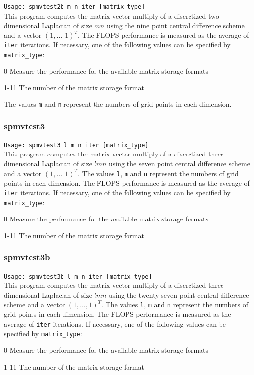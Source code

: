 \documentclass[a4paper]{article}
\newcommand{\namelistlabel}[1]{\mbox{#1}\hfill}
\newenvironment{namelist}[1]{%
\begin{list}{}
  {\let\makelabel\namelistlabel
  \settowidth{\labelwidth}{#1}
  \setlength{\leftmargin}{1.1\labelwidth}}
  }{%
\end{list}}
\begin{document}
\verb+Usage: spmvtest2b m n iter [matrix_type]+\\

This program computes the matrix-vector multiply of a 
discretized two dimensional Laplacian of size $mn$ using 
the nine point central difference scheme 
and a vector $(1,\dots,1)^T$. 
The FLOPS performance is measured as the average of {\tt iter}
iterations.
If necessary, one of the following values can be specified by {\tt matrix\_type}:
\begin{namelist}{XXXXXXXXXXXXXXXXXXXX}
\item[0] Measure the performance for the available matrix storage formats
\item[1-11] The number of the matrix storage format
\end{namelist}
The values {\tt m} and {\tt n} represent the numbers of grid points 
in each dimension. 

\subsubsection{spmvtest3}

\verb+Usage: spmvtest3 l m n iter [matrix_type]+\\

This program computes the matrix-vector multiply of a 
discretized three dimensional Laplacian of size $lmn$ using 
the seven point central difference scheme and a vector $(1,\dots,1)^T$. 
The values {\tt l}, {\tt m} and {\tt n} represent the numbers of grid
points in each dimension. 
The FLOPS performance is measured as the average of {\tt iter}
iterations.
If necessary, one of the following values can be specified by {\tt matrix\_type}:
\begin{namelist}{XXXXXXXXXXXXXXXXXXXX}
\item[0] Measure the performance for the available matrix storage formats
\item[1-11] The number of the matrix storage format
\end{namelist}

\subsubsection{spmvtest3b}

\verb+Usage: spmvtest3b l m n iter [matrix_type]+\\

This program computes the matrix-vector multiply of a 
discretized three dimensional Laplacian of size $lmn$ using 
the twenty-seven point central difference scheme and a vector $(1,\dots,1)^T$. 
The values {\tt l}, {\tt m} and {\tt n} represent the numbers of grid
points in each dimension. 
The FLOPS performance is measured as the average of {\tt iter}
iterations.
If necessary, one of the following values can be specified by {\tt matrix\_type}:
\begin{namelist}{XXXXXXXXXXXXXXXXXXXX}
\item[0] Measure the performance for the available matrix storage formats
\item[1-11] The number of the matrix storage format
\end{namelist}
\end{document}
